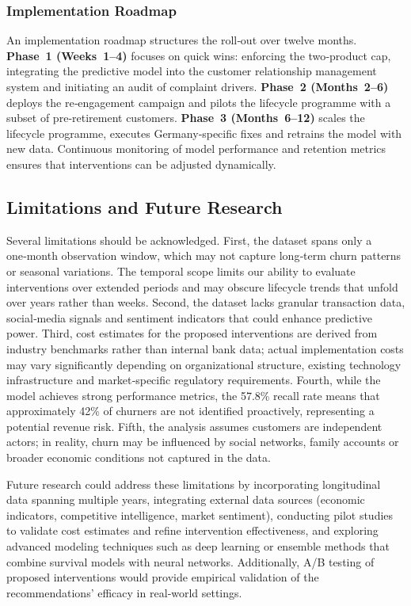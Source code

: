 \documentclass[12pt]{article}
\begin{document}
\subsubsection{Implementation Roadmap}
An implementation roadmap structures the roll‑out over twelve months.  \textbf{Phase~1 (Weeks~1–4)} focuses on quick wins: enforcing the two‑product cap, integrating the predictive model into the customer relationship management system and initiating an audit of complaint drivers.  \textbf{Phase~2 (Months~2–6)} deploys the re‑engagement campaign and pilots the lifecycle programme with a subset of pre‑retirement customers.  \textbf{Phase~3 (Months~6–12)} scales the lifecycle programme, executes Germany‑specific fixes and retrains the model with new data.  Continuous monitoring of model performance and retention metrics ensures that interventions can be adjusted dynamically.

\subsection{Limitations and Future Research}
Several limitations should be acknowledged.  First, the dataset spans only a one‑month observation window, which may not capture long‑term churn patterns or seasonal variations.  The temporal scope limits our ability to evaluate interventions over extended periods and may obscure lifecycle trends that unfold over years rather than weeks.  Second, the dataset lacks granular transaction data, social‑media signals and sentiment indicators that could enhance predictive power.  Third, cost estimates for the proposed interventions are derived from industry benchmarks rather than internal bank data; actual implementation costs may vary significantly depending on organizational structure, existing technology infrastructure and market‑specific regulatory requirements.  Fourth, while the model achieves strong performance metrics, the 57.8\% recall rate means that approximately 42\% of churners are not identified proactively, representing a potential revenue risk.  Fifth, the analysis assumes customers are independent actors; in reality, churn may be influenced by social networks, family accounts or broader economic conditions not captured in the data.

Future research could address these limitations by incorporating longitudinal data spanning multiple years, integrating external data sources (economic indicators, competitive intelligence, market sentiment), conducting pilot studies to validate cost estimates and refine intervention effectiveness, and exploring advanced modeling techniques such as deep learning or ensemble methods that combine survival models with neural networks.  Additionally, A/B testing of proposed interventions would provide empirical validation of the recommendations' efficacy in real‑world settings.
\end{document}
